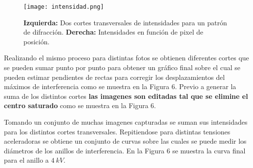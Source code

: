 \documentclass[a4paper, 10pt, spanish]{article}
\numberwithin{equation}{section}
\numberwithin{table}{section}
\begin{document}
\begin{figure}[h]
    \begin{center}

      \hspace{0.01cm}
      \texttt{[image: intensidad.png]}
    \end{center}
    \caption{\textbf{Izquierda:} Dos cortes transversales de intensidades para un patrón de difracción. \textbf{Derecha:} Intensidades en función de pixel de posición.}
    \label{fig:distanciasinterplanares}
    \end{figure}


Realizando el mismo proceso para distintas fotos se obtienen diferentes cortes que se pueden sumar punto por punto para obtener un gráfico final sobre el cual se pueden estimar pendientes de rectas para corregir los desplazamientos del máximos de interferencia como se muestra en la Figura 6. Previo a generar la suma de los distintos cortes \textbf{las imagenes son editadas tal que se elimine el centro saturado} como se muestra en la Figura 6. 

Tomando un conjunto de muchas imagenes capturadas se suman sus intensidades para los distintos cortes transversales. Repitiendose para distintas tensiones aceleradoras se obtiene un conjunto de curvas sobre las cuales se puede medir los diámetros de los anillos de interferencia. En la Figura 6 se muestra la curva final para el anillo a $4\ kV$.

%
\end{document}
